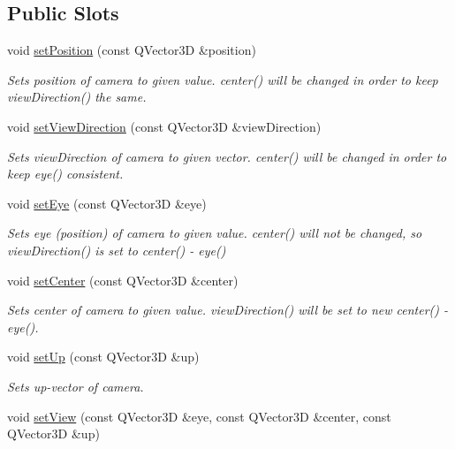\subsection*{Public Slots}
\begin{DoxyCompactItemize}
\item 
void \hyperlink{class_camera_a3ac4fcd89c146068205a3c8b73a86520}{set\+Position} (const Q\+Vector3\+D \&position)
\begin{DoxyCompactList}\small\item\em Sets position of camera to given value. center() will be changed in order to keep view\+Direction() the same. \end{DoxyCompactList}\item 
void \hyperlink{class_camera_a61a059ce3aedc779f9087dda9b5e227c}{set\+View\+Direction} (const Q\+Vector3\+D \&view\+Direction)
\begin{DoxyCompactList}\small\item\em Sets view\+Direction of camera to given vector. center() will be changed in order to keep eye() consistent. \end{DoxyCompactList}\item 
void \hyperlink{class_camera_aa445664f0bf5f3cd892a99125e4bc786}{set\+Eye} (const Q\+Vector3\+D \&eye)
\begin{DoxyCompactList}\small\item\em Sets eye (position) of camera to given value. center() will not be changed, so view\+Direction() is set to center() -\/ eye() \end{DoxyCompactList}\item 
void \hyperlink{class_camera_ae0594124b7a1baf13ef38de7a6bd0ed8}{set\+Center} (const Q\+Vector3\+D \&center)
\begin{DoxyCompactList}\small\item\em Sets center of camera to given value. view\+Direction() will be set to new center() -\/ eye(). \end{DoxyCompactList}\item 
void \hyperlink{class_camera_a037ef3f032c7fc09fa1f044260dd3a09}{set\+Up} (const Q\+Vector3\+D \&up)
\begin{DoxyCompactList}\small\item\em Sets up-\/vector of camera. \end{DoxyCompactList}\item 
void \hyperlink{class_camera_a995075e3b619176b72ad2ff0ab434ed8}{set\+View} (const Q\+Vector3\+D \&eye, const Q\+Vector3\+D \&center, const Q\+Vector3\+D \&up)

\end{DoxyCompactItemize}
